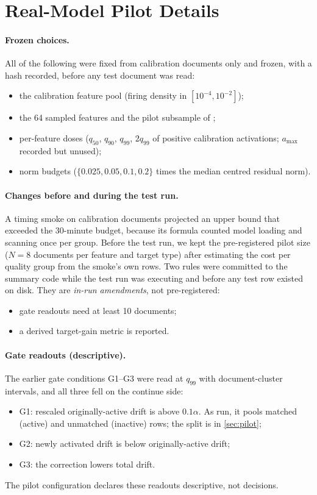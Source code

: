 \documentclass{article}
\theoremstyle{plain}
\theoremstyle{definition}
\theoremstyle{remark}
\begin{document}
\section{Real-Model Pilot Details}
\label{app:pilot}


\paragraph{Frozen choices.} All of the following were fixed from calibration documents only
and frozen, with a hash recorded, before any test document was read:
\begin{itemize}
  \item the calibration feature pool (firing density in $[10^{-4},10^{-2}]$);
  \item the 64 sampled features and the pilot subsample of \PilotFeatures;
  \item per-feature doses ($q_{50}$, $q_{90}$, $q_{99}$, $2q_{99}$ of positive calibration
  activations; $a_{\max}$ recorded but unused);
  \item norm budgets ($\{0.025, 0.05, 0.1, 0.2\}$ times the median centred residual norm).
\end{itemize}

\paragraph{Changes before and during the test run.} A timing smoke on calibration documents
projected an upper bound that exceeded the 30-minute budget, because its formula counted
model loading and scanning once per group. Before the test run, we kept the pre-registered
pilot size ($N = 8$ documents per feature and target type) after estimating the cost per
quality group from the smoke's own rows. Two rules were committed to the summary code while
the test run was executing and before any test row existed on disk. They are \emph{in-run
amendments}, not pre-registered:
\begin{itemize}
  \item gate readouts need at least 10 documents;
  \item a derived target-gain metric is reported.
\end{itemize}

\paragraph{Gate readouts (descriptive).} The earlier gate conditions G1--G3 were read at
$q_{99}$ with document-cluster intervals, and all three fell on the continue side:
\begin{itemize}
  \item G1: rescaled originally-active drift is above $0.1\alpha$. As run, it pools matched
  (active) and unmatched (inactive) rows; the split is in \cref{sec:pilot};
  \item G2: newly activated drift is below originally-active drift;
  \item G3: the correction lowers total drift.
\end{itemize}
The pilot configuration declares these readouts descriptive, not decisions.
\end{document}
